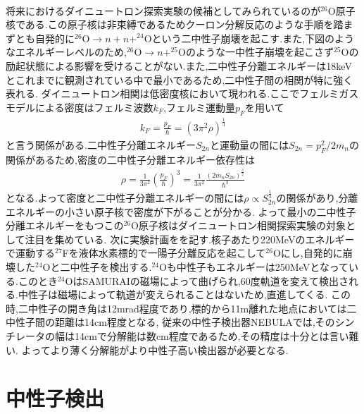 \documentclass[dvipdfmx]{jsreport}
\begin{document}
\\
将来におけるダイニュートロン探索実験の候補としてみられているのが$^{26}$O原子核である.この原子核は非束縛であるためクーロン分解反応のような手順を踏まずとも自発的に$^{26}\mathrm{O}\rightarrow n+n+^{24}\mathrm{O}$という二中性子崩壊を起こす.また,下図のようなエネルギーレベルのため,$^{26}\mathrm{O}\rightarrow n+^{25}\mathrm{O}$のような一中性子崩壊を起こさず$^{25}$Oの励起状態による影響を受けることがない.また,二中性子分離エネルギーは18keVとこれまでに観測されている中で最小であるため,二中性子間の相関が特に強く表れる.
ダイニュートロン相関は低密度核において現われる.ここでフェルミガスモデルによる密度はフェルミ波数$k_{F}$,フェルミ運動量$p_F$を用いて\begin{align}k_{F}=\frac{p_F}{\hbar}=(3\pi^2\rho)^{\frac{1}{3}}\end{align}と言う関係がある.二中性子分離エネルギー$S_{2n}$と運動量の間には$S_{2n}=p_F^2/2m_n$の関係があるため,密度の二中性子分離エネルギー依存性は\begin{align}\rho=\frac{1}{3\pi^2}\left(\frac{p_F}{\hbar}\right)^3=\frac{1}{3\pi^2}\frac{(2m_nS_{2n})^{\frac{3}{2}}}{\hbar^3}\end{align}
となる.よって密度と二中性子分離エネルギーの間には$\rho\propto S_{2n}^{\frac{1}{3}}$の関係があり,分離エネルギーの小さい原子核で密度が下がることが分かる.
よって最小の二中性子分離エネルギーをもつこの$^{26}$O原子核はダイニュートロン相関探索実験の対象として注目を集めている.
次に実験計画をを記す.核子あたり220MeVのエネルギーで運動する$^{27}$Fを液体水素標的で一陽子分離反応を起こして$^{26}$Oにし,自発的に崩壊した$^{24}$Oと二中性子を検出する.$^24$Oも中性子もエネルギーは250MeVとなっている.このとき$^{24}$OはSAMURAIの磁場によって曲げられ,60度軌道を変えて検出される.中性子は磁場によって軌道が変えられることはないため,直進してくる.
この時,二中性子の開き角は12mrad程度であり,標的から11m離れた地点においては二中性子間の距離は14cm程度となる,
従来の中性子検出器NEBULAでは,そのシンチレータの幅は14cmで分解能は数cm程度であるため,その精度は十分とは言い難い.
よってより薄く分解能がより中性子高い検出器が必要となる.
\\

\chapter{中性子検出}
\end{document}
